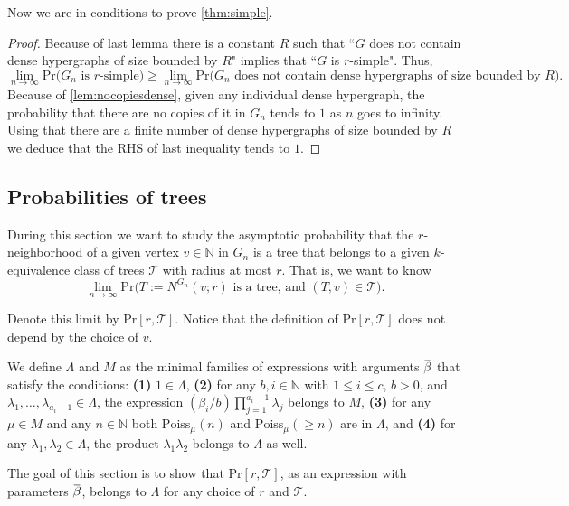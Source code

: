 \documentclass[12pt,notitlepage,a4paper]{article}
\theoremstyle{definition}
\newcommand{\N}{\mathbb{N}}
\newcommand{\Ln}{\lim\limits_{n\to \infty}}
\newcommand{\overbar}[1]{\mkern 1.5mu\overline{\mkern-1.5mu#1\mkern-1.5mu}\mkern 1.5mu}
\begin{document}
Now we are in conditions to prove \cref{thm:simple}.

\begin{proof}
	Because of last lemma there is a constant $R$ such that 
	``$G$ does not contain dense hypergraphs of size bounded by $R$" implies
	that ``$G$ is $r$-simple". Thus,
	\[ \Ln \mathrm{Pr}\big( G_n \text{ is } r \text{-simple}  \big)
	\geq \Ln \mathrm{Pr} \big( G_n \text{ does not contain dense 
	hypergraphs of size bounded by } R\big).\] 
	Because of	\cref{lem:nocopiesdense}, given any individual dense hypergraph,
	the probability that there are no copies
	of it in $G_n$ tends to $1$ as $n$ goes to infinity. Using that
	there are a finite number of dense hypergraphs of size bounded by
	$R$ we deduce that the RHS of last inequality tends to $1$. 
\end{proof}

\subsection{Probabilities of trees}

During this section we want to study
the asymptotic probability that the 
$r$-neighborhood of a given vertex $v\in \N$
in $G_n$ 
is a tree that belongs to a given $k$-equivalence
class of trees $\mathcal{T}$ with radius at most
$r$. That is, we want to know
\[\Ln \mathrm{Pr}\big( 
T:=N^{G_n}(v;r) \text{ is a tree, and } (T,v)\in \mathcal{T} \big). 
\]

 
Denote this limit by $\mathrm{Pr}[r,\mathcal{T}]$. Notice that the 
definition of  $\mathrm{Pr}[r,\mathcal{T}]$ does not depend by the
choice of $v$.\par

We define $\Lambda$ and $M$ as the minimal families
of expressions with arguments $\overbar{\beta}$ that satisfy
 the conditions: \textbf{(1)} $1\in \Lambda$, \textbf{(2)} 
for any $b,i\in \N$ with $1\leq i \leq c$,
$b > 0$, and $\lambda_1,\dots, \lambda_{a_i-1}\in \Lambda$,
the expression $(\beta_i/b) \prod_{j=1}^{a_i-1}\lambda_j$
belongs to $M$,  \textbf{(3)}
for any $\mu\in M$ and any $n\in \N$ both
$\mathrm{Poiss}_{\mu}(n)$ and $\mathrm{Poiss}_\mu(\geq n)$ are in $\Lambda$, 
and  \textbf{(4)} for any $\lambda_1,\lambda_2 \in \Lambda$, the
product $\lambda_1\lambda_2$ belongs to $\Lambda$ as well.
\par
The goal of this section is to show 
that $\mathrm{Pr}[r,\mathcal{T}]$,
as an expression with parameters
$\overbar{\beta}$, belongs to $\Lambda$ for any choice of 
$r$ and $\mathcal{T}$. \par
\end{document}
